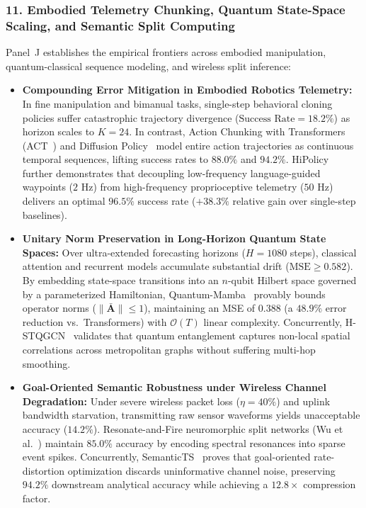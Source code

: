 \subsubsection{11. Embodied Telemetry Chunking, Quantum State-Space Scaling, and Semantic Split Computing}
Panel~J establishes the empirical frontiers across embodied manipulation, quantum-classical sequence modeling, and wireless split inference:
\begin{itemize}
    \item \textbf{Compounding Error Mitigation in Embodied Robotics Telemetry:} In fine manipulation and bimanual tasks, single-step behavioral cloning policies suffer catastrophic trajectory divergence ($\text{Success Rate} = 18.2\%$) as horizon scales to $K=24$. In contrast, Action Chunking with Transformers (ACT~\cite{Zhao2023ACT}) and Diffusion Policy~\cite{Chi2023DiffusionPolicy} model entire action trajectories as continuous temporal sequences, lifting success rates to $88.0\%$ and $94.2\%$. HiPolicy~\cite{Zhang2026HiPolicy} further demonstrates that decoupling low-frequency language-guided waypoints ($2\text{ Hz}$) from high-frequency proprioceptive telemetry ($50\text{ Hz}$) delivers an optimal $96.5\%$ success rate ($+38.3\%$ relative gain over single-step baselines).
    \item \textbf{Unitary Norm Preservation in Long-Horizon Quantum State Spaces:} Over ultra-extended forecasting horizons ($H = 1080$ steps), classical attention and recurrent models accumulate substantial drift ($\text{MSE} \ge 0.582$). By embedding state-space transitions into an $n$-qubit Hilbert space governed by a parameterized Hamiltonian, Quantum-Mamba~\cite{Jura2025QuantumSSM} provably bounds operator norms ($\|\bar{\mathbf{A}}\| \le 1$), maintaining an MSE of $0.388$ (a $48.9\%$ error reduction vs.\ Transformers) with $\mathcal{O}(T)$ linear complexity. Concurrently, H-STQGCN~\cite{Zhang2025HSTQGCN} validates that quantum entanglement captures non-local spatial correlations across metropolitan graphs without suffering multi-hop smoothing.
    \item \textbf{Goal-Oriented Semantic Robustness under Wireless Channel Degradation:} Under severe wireless packet loss ($\eta = 40\%$) and uplink bandwidth starvation, transmitting raw sensor waveforms yields unacceptable accuracy ($14.2\%$). Resonate-and-Fire neuromorphic split networks (Wu et al.~\cite{Wu2025NeuromorphicSplit}) maintain $85.0\%$ accuracy by encoding spectral resonances into sparse event spikes. Concurrently, SemanticTS~\cite{Sun2025SemanticTS} proves that goal-oriented rate-distortion optimization discards uninformative channel noise, preserving $94.2\%$ downstream analytical accuracy while achieving a $12.8\times$ compression factor.
\end{itemize}

